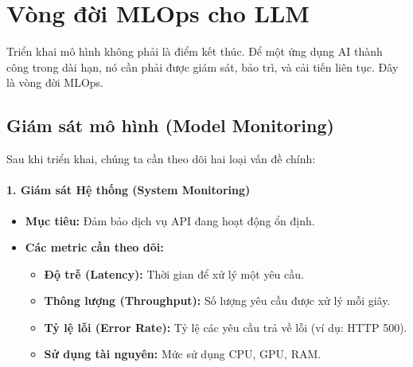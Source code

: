 
\section{Vòng đời MLOps cho LLM}
\label{sec:llmops_lifecycle}
Triển khai mô hình không phải là điểm kết thúc. Để một ứng dụng AI thành công trong dài hạn, nó cần phải được giám sát, bảo trì, và cải tiến liên tục. Đây là vòng đời MLOps.

\subsection{Giám sát mô hình (Model Monitoring)}
\label{ssec:model_monitoring}
Sau khi triển khai, chúng ta cần theo dõi hai loại vấn đề chính:

\paragraph{1. Giám sát Hệ thống (System Monitoring)}
\begin{itemize}
    \item \textbf{Mục tiêu:} Đảm bảo dịch vụ API đang hoạt động ổn định.
    \item \textbf{Các metric cần theo dõi:}
        \begin{itemize}
            \item \textbf{Độ trễ (Latency):} Thời gian để xử lý một yêu cầu.
            \item \textbf{Thông lượng (Throughput):} Số lượng yêu cầu được xử lý mỗi giây.
            \item \textbf{Tỷ lệ lỗi (Error Rate):} Tỷ lệ các yêu cầu trả về lỗi (ví dụ: HTTP 500).
            \item \textbf{Sử dụng tài nguyên:} Mức sử dụng CPU, GPU, RAM.
        \end{itemize}
\end{itemize}

